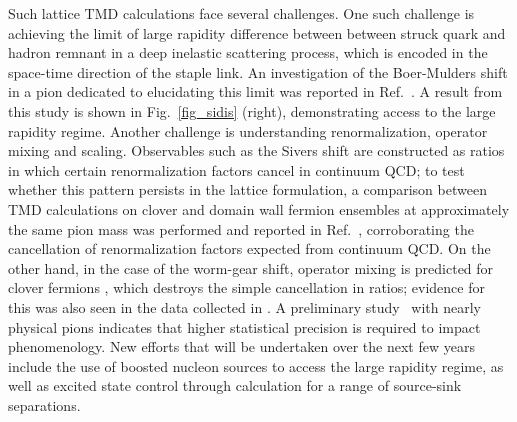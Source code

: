 Such lattice TMD calculations face several challenges. One such challenge is achieving
the  limit of large rapidity difference between between struck
quark and hadron remnant in a deep inelastic scattering process, which
is encoded in the space-time direction of the staple link. An investigation
of the Boer-Mulders shift in a pion dedicated to elucidating this limit
was reported in Ref.~\cite{Engelhardt:2015xja}. A result from this study is
shown in Fig.~\ref{fig_sidis} (right), demonstrating access to the large
rapidity regime. Another challenge is understanding renormalization,
operator mixing and scaling. Observables such as the Sivers shift are
constructed as ratios in which certain renormalization factors cancel
in continuum QCD; to test whether this pattern persists in the lattice
formulation, a comparison between TMD calculations on clover and domain
wall fermion ensembles at approximately the same pion mass was performed
and reported in Ref.~\cite{Yoon:2017qzo}, corroborating the cancellation of 
renormalization factors expected from continuum QCD.
On the other hand,
in the case of the worm-gear shift, operator mixing is predicted for
clover fermions \cite{Constantinou:2017sej}, which destroys the simple
cancellation in ratios; evidence for this was also seen in the data
collected in \cite{Yoon:2017qzo}.
A preliminary study~\cite{Engelhardt:2015czw} with nearly physical
pions indicates that higher statistical precision is required to impact phenomenology. New efforts
that will be undertaken over the next few years include the use of boosted nucleon sources to access the large
rapidity regime, as well as excited state control through calculation
for a range of source-sink separations.

%

